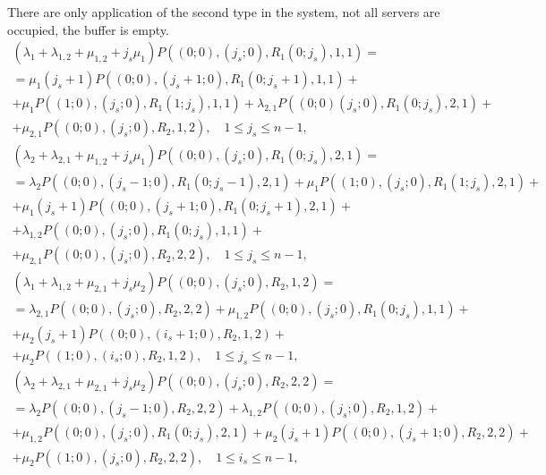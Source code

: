 \documentclass[default]{subfiles}
\begin{document}
{There are only application of the second type in the system, not all
servers are occupied, the buffer is empty.
\begin{multline}
  \left(\lambda_1+\lambda_{1,2}+\mu_{1,2}+j_s\mu_1\right)
  P\left((0;0),(j_s;0),R_1(0;j_s),1,1\right)=\\ = \mu_1 (j_s+1)
  P\left((0;0),(j_s+1;0),R_1(0;j_s+1),1,1\right) + \\ + \mu_1
  P\left((1;0),(j_s;0),R_1(1;j_s),1,1\right) + \lambda_{2,1}
  P\left((0;0)(j_s;0),R_1(0;j_s),2,1\right) + \\ +\mu_{2,1}
  P\left((0;0),(j_s;0),R_2,1,2\right), \quad 1\leqslant j_s\leqslant
  n-1,
\label{eq:5.1}
\end{multline}
\begin{multline}
  \left(\lambda_2+\lambda_{2,1}+\mu_{1,2}+j_s\mu_1\right)
  P\left((0;0),(j_s;0),R_1(0;j_s),2,1\right)=\\ = \lambda_2
  P\left((0;0),(j_s-1;0),R_1(0;j_s-1),2,1\right) + \mu_1
  P\left((1;0),(j_s;0),R_1(1;j_s),2,1\right)+\\ + \mu_1 (j_s+1)
  P\left((0;0),(j_s+1;0),R_1(0;j_s+1),2,1\right) +\\ + \lambda_{1,2}
  P\left((0;0),(j_s;0),R_1(0;j_s),1,1\right) + \\ + \mu_{2,1}
  P\left((0;0),(j_s;0),R_2,2,2\right), \quad 1\leqslant j_s\leqslant
  n-1,
\label{eq:5.2}
\end{multline}
\begin{multline}
  \left(\lambda_1+\lambda_{1,2}+\mu_{2,1}+j_s\mu_2\right)
  P\left((0;0),(j_s;0),R_2,1,2\right)= \\ = \lambda_{2,1}
  P\left((0;0),(j_s;0),R_2,2,2\right) + \mu_{1,2}
  P\left((0;0),(j_s;0),R_1(0;j_s),1,1\right)+\\ + \mu_2 (j_s+1)
  P\left((0;0),(i_s+1;0),R_2,1,2\right) + \\ +\mu_2
  P\left((1;0),(i_s;0),R_2,1,2\right),\quad 1\leqslant j_s\leqslant
  n-1,
\label{eq:5.3}
\end{multline}
\begin{multline}
  \left(\lambda_2+\lambda_{2,1}+\mu_{2,1}+j_s\mu_2\right)
  P\left((0;0),(j_s;0),R_2,2,2\right)=\\ = \lambda_2
  P\left((0;0),(j_s-1;0),R_2,2,2\right) + \lambda_{1,2}
  P\left((0;0),(j_s;0),R_2,1,2\right) + \\ + \mu_{1,2}
  P\left((0;0),(j_s;0),R_1(0;j_s),2,1\right)+ \mu_2 (j_s+1)
  P\left((0;0),(j_s+1;0),R_2,2,2\right) + \\ + \mu_2
  P\left((1;0),(j_s;0),R_2,2,2\right), \quad 1\leqslant i_s\leqslant
  n-1,
\label{eq:5.4}
\end{multline}

}
\end{document}
